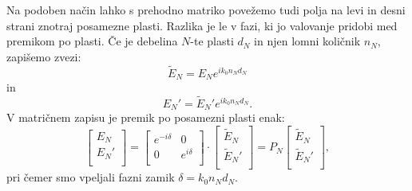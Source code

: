 Na podoben način lahko s prehodno matriko povežemo tudi polja na 
levi in desni strani znotraj posamezne plasti. Razlika
je le v fazi, ki jo valovanje pridobi med premikom po plasti. 
Če je debelina $N$-te plasti $d_N$ in njen
lomni količnik $n_N$, zapišemo zvezi:
\begin{equation}
\tilde{E}_N = E_N e^{i k_0 n_N d_N}
\label{eq:06_60}
\end{equation}
in 
\begin{equation}
E_N' = \tilde{E}_N' e^{i k_0 n_N d_N}.
\label{eq:06_61}
\end{equation}
V matričnem zapisu je premik po posamezni plasti enak:
\begin{equation}
\left[\begin{array}{c}
E_{N}\\
E_{N}'\\
\end{array}\right] =
\left[\begin{array}{cc}
e^{-i\delta}& 0\\
0& e^{i\delta}\\
\end{array}\right]\cdot
\left[\begin{array}{c}
\tilde{E}_N\\
\tilde{E}_N'\\
\end{array}\right] = 
P_{N}\left[\begin{array}{c}
\tilde{E}_N\\
\tilde{E}_N'\\
\end{array}\right]\!\!,
\label{eq:06_62}
\end{equation}
pri čemer smo vpeljali fazni zamik $\delta = k_0 n_N d_N$.

